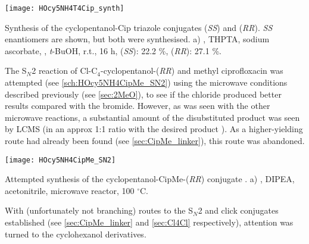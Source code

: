 \begin{scheme}[H]
	\begin{center}
		\texttt{[image: HOcy5NH4T4Cip\_synth]}
		\caption{Synthesis of the cyclopentanol-Cip triazole conjugates  (\textit{SS}) and 
		 (\textit{RR}). 
		\textit{SS} enantiomers are shown, but both were synthesised.
		a) , THPTA, sodium ascorbate, , \textit{t}-BuOH, r.t., 16 h, 
		 (\textit{SS}): 22.2 \%,
		 (\textit{RR}): 27.1 \%. 
		\label{sch:HOcy5NH4T4Cip_synth}}
	\end{center}
\end{scheme}

The S$_N$2 reaction of Cl-C$_4$-cyclopentanol-(\textit{RR})  and methyl ciprofloxacin  was attempted (see \ref{sch:HOcy5NH4CipMe_SN2}) using the microwave conditions described previously (see \ref{sec:2MeO}), to see if the chloride produced better results compared with the bromide. However, as was seen with the other microwave reactions, a substantial amount of the disubstituted product  was seen by LCMS (in an approx 1:1 ratio with the desired product ). As a higher-yielding route had already been found (see \ref{sec:CipMe_linker}), this route was abandoned.

\begin{scheme}[H]
	\begin{center}
		\texttt{[image: HOcy5NH4CipMe\_SN2]}
		\caption{Attempted synthesis of the cyclopentanol-CipMe-(\textit{RR}) conjugate .
		a) , DIPEA, acetonitrile, microwave reactor, 100 $^{\circ}$C.
		\label{sch:HOcy5NH4CipMe_SN2}}
	\end{center}
\end{scheme}

With (unfortunately not branching) routes to the S$_N$2 and click conjugates established (see \ref{sec:CipMe_linker} and \ref{sec:Cl4Cl} respectively), attention was turned to the cyclohexanol derivatives.